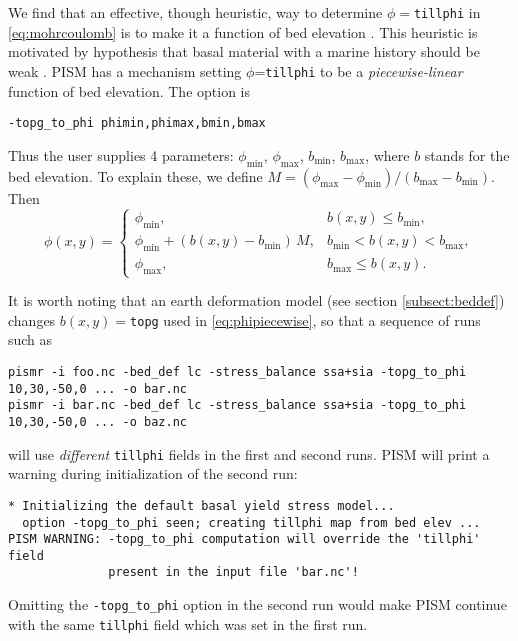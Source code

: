 We find that an effective, though heuristic, way to determine $\phi=$\texttt{tillphi} in \eqref{eq:mohrcoulomb} is to make it a function of bed elevation \cite{AschwandenAdalgeirsdottirKhroulev,Martinetal2011,Winkelmannetal2011}.  This heuristic is motivated by hypothesis that basal material with a marine history should be weak \cite{HuybrechtsdeWolde}.  PISM has a mechanism setting $\phi$=\texttt{tillphi} to be a \emph{piecewise-linear} function of bed elevation.  The option is
\begin{verbatim}
-topg_to_phi phimin,phimax,bmin,bmax
\end{verbatim}
\newcommand{\phimin}{\phi_{\mathrm{min}}}
\newcommand{\phimax}{\phi_{\mathrm{max}}}
\newcommand{\bmin}{b_{\mathrm{min}}}
\newcommand{\bmax}{b_{\mathrm{max}}}
Thus the user supplies 4 parameters: $\phimin$, $\phimax$, $\bmin$, $\bmax$, where $b$ stands for the bed elevation.  To explain these, we define $M = (\phimax - \phimin) / (\bmax - \bmin)$.  Then
\begin{equation}
  \phi(x,y) =
  \begin{cases}
    \phimin, & b(x,y) \le \bmin, \\
    \phimin + (b(x,y) - \bmin) \,M, & \bmin < b(x,y) < \bmax, \\
    \phimax, & \bmax \le b(x,y).
  \end{cases}
  \label{eq:phipiecewise}
\end{equation}

It is worth noting that an earth deformation model (see section \ref{subsect:beddef}) changes $b(x,y)=$\texttt{topg} used in \eqref{eq:phipiecewise}, so that a sequence of runs such as
\begin{verbatim}
pismr -i foo.nc -bed_def lc -stress_balance ssa+sia -topg_to_phi 10,30,-50,0 ... -o bar.nc
pismr -i bar.nc -bed_def lc -stress_balance ssa+sia -topg_to_phi 10,30,-50,0 ... -o baz.nc
\end{verbatim}
will use \emph{different} \texttt{tillphi} fields in the first and second runs.  PISM will print a warning during initialization of the second run:
\begin{verbatim}
* Initializing the default basal yield stress model...
  option -topg_to_phi seen; creating tillphi map from bed elev ...
PISM WARNING: -topg_to_phi computation will override the 'tillphi' field
              present in the input file 'bar.nc'!
\end{verbatim}
Omitting the \texttt{-topg_to_phi} option in the second run would make PISM continue with the same \texttt{tillphi} field which was set in the first run.


